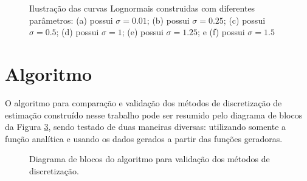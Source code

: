 \begin{figure}[H]
\begin{subfigure}[b]{0.3\textwidth}
		\caption{}
		\label{fig:sig150}
	\end{subfigure}
	
	\caption{Ilustração das curvas Lognormais construidas com diferentes parâmetros: (a) possui $\sigma = 0.01$; (b) possui $\sigma = 0.25$; (c) possui $\sigma = 0.5$; (d) possui $\sigma = 1$; (e) possui $\sigma = 1.25$; e (f) possui $\sigma = 1.5$}
	\label{fig:Lognormal}
\end{figure}





\section{Algoritmo}

O algoritmo para comparação e validação dos métodos de discretização de estimação construído nesse trabalho pode ser resumido pelo diagrama de blocos da Figura \ref{fig:08}, sendo testado de duas maneiras diversas: utilizando somente a função analítica e usando os dados gerados a partir das funções geradoras.

\begin{figure}[H]
	\begin{center}
		\caption{Diagrama de blocos do algoritmo para validação dos métodos de discretização.}\label{fig:08}
	\end{center}
\end{figure}


